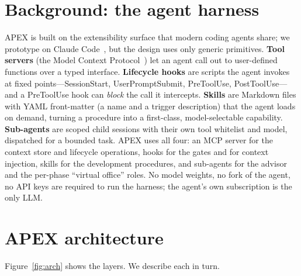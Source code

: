 \documentclass[sigconf,review,anonymous=false]{acmart}
\begin{document}
\section{Background: the agent harness}
APEX is built on the extensibility surface that modern coding agents share; we
prototype on Claude Code~\cite{anthropic2025cc,liu2026divecc}, but the design uses
only generic primitives. \textbf{Tool servers} (the Model Context
Protocol~\cite{anthropic2024mcp}) let an agent call out to user-defined
functions over a typed interface. \textbf{Lifecycle hooks} are scripts the agent
invokes at fixed points---\textsf{SessionStart}, \textsf{UserPromptSubmit},
\textsf{PreToolUse}, \textsf{PostToolUse}---and a \textsf{PreToolUse} hook can
\emph{block} the call it intercepts. \textbf{Skills} are Markdown files with YAML
front-matter (a name and a trigger description) that the agent loads on demand,
turning a procedure into a first-class, model-selectable capability.
\textbf{Sub-agents} are scoped child sessions with their own tool whitelist and
model, dispatched for a bounded task. APEX uses all four: an MCP server for the
context store and lifecycle operations, hooks for the gates and for context
injection, skills for the development procedures, and sub-agents for the advisor
and the per-phase ``virtual office'' roles. No model weights, no fork of the agent,
no API keys are required to run the harness; the agent's own subscription is the
only LLM.

\section{APEX architecture}
Figure~\ref{fig:arch} shows the layers. We describe each in turn.
\end{document}
